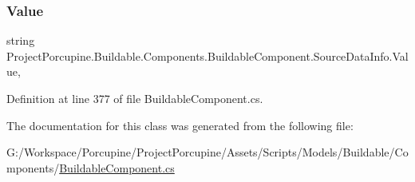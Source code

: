 \subsubsection{\texorpdfstring{Value}{Value}}
{\footnotesize\ttfamily string Project\+Porcupine.\+Buildable.\+Components.\+Buildable\+Component.\+Source\+Data\+Info.\+Value\hspace{0.3cm}{\ttfamily [get]}, {\ttfamily [set]}}



Definition at line 377 of file Buildable\+Component.\+cs.



The documentation for this class was generated from the following file\+:\begin{DoxyCompactItemize}
\item 
G\+:/\+Workspace/\+Porcupine/\+Project\+Porcupine/\+Assets/\+Scripts/\+Models/\+Buildable/\+Components/\hyperlink{_buildable_component_8cs}{Buildable\+Component.\+cs}\end{DoxyCompactItemize}
